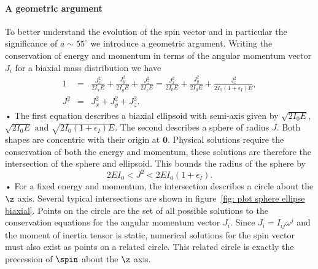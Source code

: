 \documentclass[/home/greg/Thesis/main/main.tex]{subfiles}
\begin{document}
\paragraph{A geometric argument}
To better understand the evolution of the spin vector and in particular the
significance of $a \sim 55^{\circ}$ we introduce a geometric argument. 
Writing the conservation of energy and momentum in terms
of the angular momentum vector $J_{i}$ for a biaxial mass distribution we have 
\begin{eqnarray}
1 & = & \frac{J_{x}^{2}}{2I_{x}E}+\frac{J_{y}^{2}}{2I_{y}E}+\frac{J_{z}^{2}}{2I_{z}E} =  \frac{J_{x}^{2}}{2I_{0}E}+\frac{J_{y}^{2}}{2I_{0}E}+\frac{J_{z}^{2}}{2I_{0}(1+\epsilon_{I})E},\\
J^{2} & = & J_{x}^{2}+J_{y}^{2}+J_{z}^{2}.
\label{eqn: sphere ellipsoid biaxial}
\end{eqnarray}•
The first equation describes a biaxial ellipsoid with semi-axis given by
$\sqrt{2I_{0}E}$, $\sqrt{2I_{0}E}$ and $\sqrt{2I_{0}(1+\epsilon_{I})E}$.  The
second describes a sphere of radius $J$. Both shapes are concentric with their origin
at $\boldsymbol{0}$. Physical solutions require the conservation of both the energy
and momentum, these solutions are therefore the intersection of the sphere and 
ellipsoid. This bounds the radius of the sphere by
\begin{equation}
2EI_{0}<J^{2}<2EI_{0}(1+\epsilon_{I}).
\end{equation}•
For a fixed energy and momentum, the intersection describes a circle about the
$\z$ axis. Several typical intersections are shown in figure~\ref{fig: plot
sphere ellipse biaxial}. Points on the circle are the set of all possible
solutions to the conservation equations for the angular momentum vector
$J_{i}$. Since $J_{i}=I_{ij}\omega^{j}$ and the moment of inertia tensor is
static, numerical solutions for the spin vector must also exist as points on a
related circle. This related circle is exactly the precession of $\spin$ about
the $\z$ axis.
\end{document}
